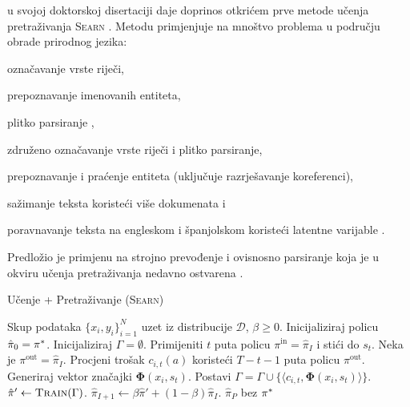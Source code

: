 \citet{daume06thesis} u svojoj doktorskoj disertaciji daje doprinos otkrićem
prve metode učenja pretraživanja \textsc{Searn} .
Metodu primjenjuje na mnoštvo problema u području obrade prirodnog jezika:
\begin{inlinelist}
  \item označavanje vrste riječi,
  \item prepoznavanje imenovanih entiteta,
  \item plitko parsiranje ,
  \item združeno označavanje vrste riječi i plitko parsiranje,
  \item prepoznavanje i praćenje entiteta (uključuje razrješavanje koreferenci),
  \item sažimanje teksta koristeći više dokumenata i
  \item poravnavanje teksta na engleskom i španjolskom koristeći latentne
  varijable .
\end{inlinelist}
Predložio je primjenu na strojno prevođenje i ovisnosno parsiranje koja je u
okviru učenja pretraživanja nedavno ostvarena
\citep{he2015syntax,chang2015learning}.

\begin{algorithm}
\caption{Učenje + Pretraživanje (\textsc{Searn})}\label{alg:searn}
\begin{algorithmic}[1]
\Require Skup podataka $\{x_i, y_i\}_{i=1}^N$ uzet iz distribucije $\mathcal{D}$,
  $\beta \geq 0$. %
\State Inicijaliziraj policu $\hat{\pi}_0 = \pi\ssymbol{1}$.
\ForAll{$I \in \big[0,1,2,\ldots,P)$}
    \State Inicijaliziraj $\Gamma = \emptyset$. 
      \State Primijeniti $t$ puta policu $\pi^{\text{in}} = \hat{\pi}_{I}$  i stići do $s_t$. 
      \label{alg:searn:action}
        \State Neka je  $\pi^{\text{out}} = \hat{\pi}_{I}$.\label{alg:searn:rolloutpolicy}
        \State Procjeni trošak $c_{i,t}(a)$ koristeći $T-t-1$ puta policu $\pi^{\text{out}}$. \label{alg:searn:rollout}
      \EndFor
      \State Generiraj vektor značajki $\mathbf{\Phi}(x_i, s_t)$.
      \State Postavi $\Gamma = \Gamma \cup \{\langle c_{i,t}, \mathbf{\Phi}(x_i, s_t) \rangle\}$.
    \EndFor
  \EndFor
  \State $\hat{\pi}' \gets \textsc{Train}(\Gamma)$.\label{alg:searn:train}
  \State $\hat{\pi}_{I+1} \gets \beta \hat{\pi}' + (1-\beta) \hat{\pi}_{I}$. \label{alg:searn:mixture}
\EndFor
\State \Return $\hat{\pi}_{P}$ bez $\pi\ssymbol{1}$
\end{algorithmic}
\end{algorithm}

